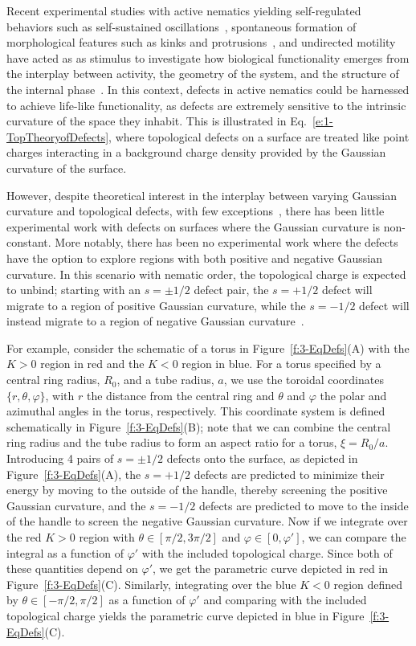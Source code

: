 Recent experimental studies with active nematics yielding self-regulated behaviors such as self-sustained oscillations~\cite{RN9}, spontaneous formation of morphological features such as kinks and protrusions~\cite{RN9,RN3}, and undirected motility~\cite{RN9,RN3} have acted as as stimulus to investigate how biological functionality emerges from the interplay between activity, the geometry of the system, and the structure of the internal phase~\cite{RN160,RN51,RN10}.
In this context, defects in active nematics could be harnessed to achieve life-like functionality, as defects are extremely sensitive to the intrinsic curvature of the space they inhabit.
This is illustrated in Eq.~\ref{e:1-TopTheoryofDefects}, where topological defects on a surface are treated like point charges interacting in a background charge density provided by the Gaussian curvature of the surface.

However, despite theoretical interest in the interplay between varying Gaussian curvature and topological defects, with few exceptions~\cite{RN84,RN25,RN73,RN81}, there has been little experimental work with defects on surfaces where the Gaussian curvature is non-constant.
More notably, there has been no experimental work where the defects have the option to explore regions with both positive and negative Gaussian curvature.
In this scenario with nematic order, the topological charge is expected to unbind; starting with an $s = \pm 1/2$ defect pair, the $s = +1/2$ defect will migrate to a region of positive Gaussian curvature, while the $s=  -1/2$ defect will instead migrate to a region of negative Gaussian curvature~\cite{RN17,RN19,RN22}.

For example, consider the schematic of a torus in Figure~\ref{f:3-EqDefs}(A) with the $K>0$ region in red and the $K<0$ region in blue.
For a torus specified by a central ring radius, $R_0$, and a tube radius, $a$, we use the toroidal coordinates $\{r,\theta,\varphi\}$, with $r$ the distance from the central ring and $\theta$ and $\varphi$ the polar and azimuthal angles in the torus, respectively.
This coordinate system is defined schematically in Figure~\ref{f:3-EqDefs}(B); note that we can combine the central ring radius and the tube radius to form an aspect ratio for a torus, $\xi = R_0/a$.
Introducing 4 pairs of $s = \pm 1/2$ defects onto the surface, as depicted in Figure~\ref{f:3-EqDefs}(A), the $s = +1/2$ defects are predicted to minimize their energy by moving to the outside of the handle, thereby screening the positive Gaussian curvature, and the $s = -1/2$ defects are predicted to move to the inside of the handle to screen the negative Gaussian curvature.
Now if we integrate over the red $K>0$ region with $\theta \in [\pi/2,3 \pi/2]$ and $\varphi \in [0,\varphi']$, we can compare the integral as a function of $\varphi'$ with the included topological charge.
Since both of these quantities depend on $\varphi'$, we get the parametric curve depicted in red in Figure~\ref{f:3-EqDefs}(C).
Similarly, integrating over the blue $K<0$ region defined by $\theta \in [-\pi/2,\pi/2]$ as a function of $\varphi'$ and comparing with the included topological charge yields the parametric curve depicted in blue in Figure~\ref{f:3-EqDefs}(C).

